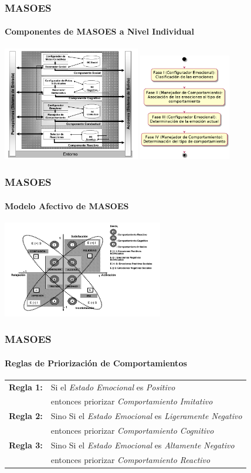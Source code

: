 \documentclass{beamer}
\begin{document}
\begin{frame}
\frametitle{MASOES}
\framesubtitle{Componentes de MASOES a Nivel Individual}
\centering
\includegraphics[width=6cm]{ilustraciones/componentes-masoes-individual}
\includegraphics[width=4cm]{ilustraciones/componente-conductual}
\end{frame}

\begin{frame}
\frametitle{MASOES}
\framesubtitle{Modelo Afectivo de MASOES}
\centering
\includegraphics[width=7cm]{ilustraciones/modelo-afectivo}
\end{frame}

\begin{frame}
\frametitle{MASOES}
\framesubtitle{Reglas de Priorización de Comportamientos}
\begin{table}[!ht]
\centering
\scriptsize
\begin{tabular}{ll}
\hline
\textbf{Regla 1:} & Si el \textit{Estado Emocional} es \textit{Positivo} \\
& entonces priorizar \textit{Comportamiento Imitativo} \\
\textbf{Regla 2:} & Sino Si el \textit{Estado Emocional} es \textit{Ligeramente Negativo} \\
& entonces priorizar \textit{Comportamiento Cognitivo} \\
\textbf{Regla 3:} & Sino Si el \textit{Estado Emocional} es \textit{Altamente Negativo} \\
& entonces priorizar \textit{Comportamiento Reactivo} \\
\hline
\end{tabular}
\end{table}
\end{frame}
\end{document}
